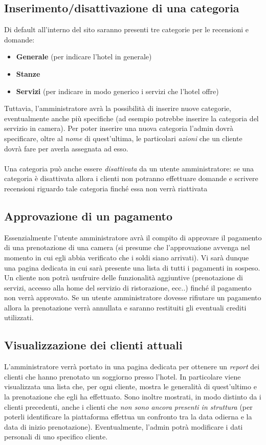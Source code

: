 \documentclass [a4paper, 12pt]{book}
\begin{document}
\medskip

\subsection{Inserimento/disattivazione di una categoria} 
Di default all'interno del sito saranno presenti tre categorie per le recensioni e domande:
\begin{itemize}
\item \textbf{Generale} (per indicare l'hotel in generale)
\item \textbf{Stanze}
\item \textbf{Servizi} (per indicare in modo generico i servizi che l'hotel offre)
\end{itemize}
Tuttavia, l'amministratore avrà la possibilità di inserire nuove categorie, eventualmente anche più specifiche (ad esempio potrebbe inserire la categoria del servizio in camera). Per poter inserire una nuova categoria l'admin dovrà specificare, oltre al \textit{nome} di quest'ultima, le particolari \textit{azioni} che un cliente dovrà fare per averla assegnata ad esso.\\\\
Una categoria può anche essere \textit{disattivata} da un utente amministratore: se una categoria è disattivata allora i clienti non potranno effettuare domande e scrivere recensioni riguardo tale categoria finché essa non verrà riattivata

\medskip

\subsection{Approvazione di un pagamento}
\label{ApprovazionePagamento}
Essenzialmente l'utente amministratore avrà il compito di approvare il pagamento di una prenotazione di una camera (si presume che l'approvazione avvenga nel momento in cui egli abbia verificato che i soldi siano arrivati). Vi sarà dunque una pagina dedicata in cui sarà presente una lista di tutti i pagamenti in sospeso. Un cliente non potrà usufruire delle funzionalità aggiuntive (prenotazione di servizi, accesso alla home del servizio di ristorazione, ecc..) finché il pagamento non verrà approvato. Se un utente amministratore dovesse rifiutare un pagamento allora la prenotazione verrà annullata e saranno restituiti gli eventuali crediti utilizzati.
\subsection{Visualizzazione dei clienti attuali}
L'amministratore verrà portato in una pagina dedicata per ottenere un \textit{report} dei clienti che hanno prenotato un soggiorno presso l'hotel. In particolare viene visualizzata una lista che, per ogni cliente, mostra le generalità di quest'ultimo e la prenotazione che egli ha effettuato. Sono inoltre mostrati, in modo distinto da i clienti precedenti, anche i clienti che \textit{non sono ancora presenti in struttura} (per poterli identificare la piattaforma effettua un confronto tra la data odierna e la data di inizio prenotazione). Eventualmente, l'admin potrà modificare i dati personali di uno specifico cliente.
\end{document}
